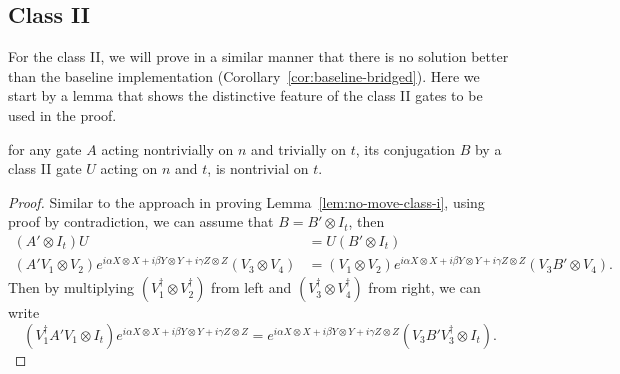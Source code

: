 \subsection{Class II}

For the class II, we will prove in a similar manner that there is no solution better than the baseline implementation (Corollary~\ref{cor:baseline-bridged}). Here we start by a lemma that shows the distinctive feature of the class II gates to be used in the proof.

\begin{lemma}\label{lem:no-trivial-commutation}
  for any gate $A$ acting nontrivially on $n$ and trivially on $t$, its conjugation $B$ by a class II gate $U$ acting on $n$ and $t$, is nontrivial on $t$. 
\end{lemma}
\begin{proof}
  Similar to the approach in proving Lemma~\ref{lem:no-move-class-i}, using proof by contradiction, we can assume that $B = B' \otimes I_t$, then
  \begin{equation}
    \begin{aligned}
      (A' \otimes I_t) U  &= U (B' \otimes I_t) \\
      (A' V_1 \otimes V_2) e^{i \alpha X \otimes X + i \beta Y \otimes Y + i \gamma Z \otimes Z} (V_3 \otimes V_4) &= (V_1 \otimes V_2) e^{i \alpha X \otimes X + i \beta Y \otimes Y + i \gamma Z \otimes Z} (V_3 B' \otimes V_4). 
    \end{aligned}
  \end{equation}
  Then by multiplying $(V_1^\dagger \otimes V_2^\dagger)$ from left and $(V_3^\dagger \otimes V_4^\dagger)$ from right, we can write
  \begin{equation}
      (V_1^\dagger A' V_1 \otimes I_t) e^{i \alpha X \otimes X + i \beta Y \otimes Y + i \gamma Z \otimes Z} = e^{i \alpha X \otimes X + i \beta Y \otimes Y + i \gamma Z \otimes Z} (V_3 B' V_3^\dagger \otimes I_t).
  \end{equation}


\end{proof}
